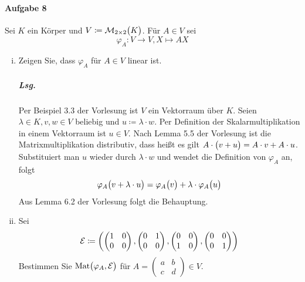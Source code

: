 \documentclass{scrreprt}
\newcommand{\Mat}{\text{Mat}}
\begin{document}
\paragraph{Aufgabe 8} Sei $K$ ein Körper und
$V \coloneqq \mathcal{M}_{2 \times 2}\qty\big(K)$.
Für $A \in V$ sei
\[
  \varphi_A \colon V \to V, X \mapsto AX
\]
\begin{enumerate}[(i)]
\item Zeigen Sie, dass $\varphi_A$ für $A \in V$ linear ist.

  \subparagraph{Lsg.} Per Beispiel 3.3 der Vorlesung ist $V$ ein Vektorraum über
  $K$.
  Seien $\lambda \in K, v, w \in V$ beliebig und $u \coloneqq \lambda \cdot w$.
  Per Definition der Skalarmultiplikation in einem Vektorraum ist $u \in V$.
  Nach Lemma 5.5 der Vorlesung ist die Matrixmultiplikation distributiv, dass
  heißt es gilt $A \cdot \qty\big(v + u) = A \cdot v + A \cdot u$.
  Substituiert man $u$ wieder durch $\lambda \cdot w$ und wendet die Definition
  von $\varphi_A$ an, folgt
  \[
    \varphi_A\qty\big(v + \lambda \cdot u) =
    \varphi_A\qty\big(v) + \lambda \cdot \varphi_A\qty\big(u)
  \]
  Aus Lemma 6.2 der Vorlesung folgt die Behauptung.

\item Sei
  \[
    \mathcal{E} \coloneqq \qty(
      \begin{pmatrix}
        1 & 0 \\
        0 & 0 \\
      \end{pmatrix}, \begin{pmatrix}
        0 & 1 \\
        0 & 0 \\
      \end{pmatrix}, \begin{pmatrix}
        0 & 0 \\
        1 & 0 \\
      \end{pmatrix}, \begin{pmatrix}
        0 & 0 \\
        0 & 1 \\
      \end{pmatrix}
    )
  \]
  Bestimmen Sie $\Mat\qty\big(\varphi_A, \mathcal{E})$ für
  $A = \begin{pmatrix}a&b\\c&d\end{pmatrix} \in V$.


\end{enumerate}
\end{document}
